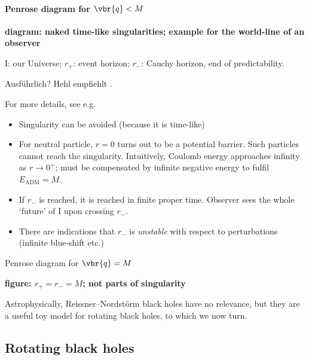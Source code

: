 \paragraph{Penrose diagram for $\vbr{q} < M$}

\textbf{diagram: naked time-like singularities; example for the world-line
of an observer}

I: our Universe; $r_+$: event horizon; $r_-$: Cauchy horizon, end of
predictability.

Ausführlich? Hehl empfiehlt \cite{Griffiths2009}.

For more details, see e.g.\
\cite{Hawking1973,chandrasekhar1998mathematical}


\begin{unamedrem}
\begin{itemize}
\item
Singularity can be avoided (because it is time-like)
\item
For neutral particle, $r = 0$ turns out to be a potential barrier. Such
particles cannot reach the singularity. Intuitively, Coulomb energy
approaches infinity as $r \to 0^+$; must be compensated by infinite negative
energy to fulfil $E_\text{ADM} = M$.
\item
If $r_-$ is reached, it is reached in finite proper time. Observer sees the
whole `future' of I upon crossing $r_-$.
\item
There are indications that $r_-$ is \emph{unstable} with respect to
perturbations (infinite blue-shift etc.)
\end{itemize}
\end{unamedrem}

\begin{nameddef}{Penrose diagram for $\vbr{q} = M$}

\textbf{figure: $r_+ = r_- = M$; not parts of singularity}

\end{nameddef} %

Astrophysically, Reissner--Nordstörm black holes have no relevance, but they
are a useful toy model for rotating black holes, to which we now turn.


\subsection{Rotating black holes}

